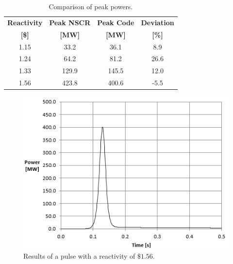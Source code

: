 \documentclass[11pt,letterpaper,titlepage]{article}
\begin{document}
\begin{table}[H]
\centering
\caption{Comparison of peak powers.}
\label{table:peakPowers}
\begin{tabular}{|c|c|c|c|}
\hline
\textbf{Reactivity} & \textbf{Peak NSCR} & \textbf{Peak Code} & \textbf{Deviation} \\
\textbf{{[}\${]}}   & \textbf{{[}MW{]}}  & \textbf{{[}MW{]}}  & \textbf{{[}\%{]}}  \\ \hline
1.15                & 33.2               & 36.1               & 8.9                \\ \hline
1.24                & 64.2               & 81.2               & 26.6               \\ \hline
1.33                & 129.9              & 145.5              & 12.0               \\ \hline
1.56                & 423.8              & 400.6              & -5.5               \\ \hline
\end{tabular}
\end{table}

\begin{center}
	\begin{minipage}[c]{0.82\textwidth}

		\begin{figure}[H]
		
			\includegraphics{Test2_Plot.png}
			\caption{Results of a pulse with a reactivity of $\$1.56$.}
			\label{figure:Test2_Plot}
		\end{figure}
	\end{minipage}
\end{center}
\end{document}
